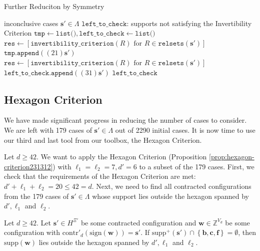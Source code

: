 \begin{algorithm}
\caption{Further Reduciton by Symmetry}
\label{alg:sjfnejksnfejwkkfw}
\begin{algorithmic}[1]
 inconclusive cases $\mathbf{s}' \in \Lambda$
\Ensure $\texttt{left\_to\_check}$: supports not satisfying the Invertibility Criterion
\State $\texttt{tmp} \gets \texttt{list()}, \texttt{left\_to\_check} \gets \texttt{list()}$ 
    \State $\texttt{res} \gets [\texttt{invertibility\_criterion}(R) \text{ for } R \in \texttt{relsets}(\mathbf{s}')]$
        \State $\texttt{tmp.append}((21)\mathbf{s}')$
    \EndIf
\EndFor
{}
    \State $\texttt{res} \gets [\texttt{invertibility\_criterion}(R) \text{ for } R \in \texttt{relsets}(\mathbf{s}')]$
        \State $\texttt{left\_to\_check.append}((31)\mathbf{s}')$
    \EndIf
\EndFor
\State \Return $\texttt{left\_to\_check}$
\end{algorithmic}
\end{algorithm}

\subsection{Hexagon Criterion}

We have made significant progress in reducing the number of cases to consider. We are left with 179 cases of \( \mathbf{s}' \in \Lambda \) out of 2290 initial cases. It is now time to use our third and last tool from our toolbox, the Hexagon Criterion. 

Let \( d \geq 42 \). We want to apply the Hexagon Criterion (Proposition \ref{prop:hexagon-criterion231312}) with \( \ell_1 = \ell_2 = 7, d' = 6 \) to a subset of the 179 cases.
First, we check that the requirements of the Hexagon Criterion are met: \( d' + \ell_1 + \ell_2  = 20 \leq 42 = d \). Next, we need to find all contracted configurations from the 179 cases of \( \mathbf{s}' \in \Lambda \) whose support lies outside the hexagon spanned by \( d', \ell_1 \) and \( \ell_2 \).

\begin{proposition}
    Let \( d \geq 42 \).
    Let \( \mathbf{s}' \in H^{\Xi'} \) be some contracted configuration and \( \mathbf{w} \in \mathbb{Z}^{V_d} \) be some configuration with \( \mathrm{contr}'_d(\mathrm{sign}(\mathbf{w})) = \mathbf{s}' \). If \( \mathrm{supp}^+(\mathbf{s}') \cap \left\{ \mathbf{b}, \mathbf{c}, \mathbf{f} \right\} = \emptyset\), then \( \mathrm{supp}(\mathbf{w}) \) lies outside the hexagon spanned by \( d', \ell_1 \) and \( \ell_2 \).
\end{proposition}

